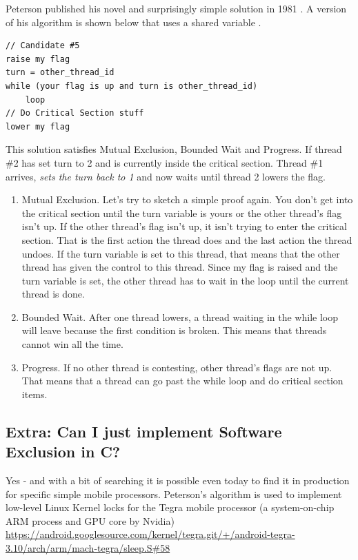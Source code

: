 Peterson published his novel and surprisingly simple solution in 1981 \cite{Peterson1981MythsAT}.
A version of his algorithm is shown below that uses a shared variable .

\begin{lstlisting}
// Candidate #5
raise my flag
turn = other_thread_id
while (your flag is up and turn is other_thread_id)
    loop
// Do Critical Section stuff
lower my flag
\end{lstlisting}

This solution satisfies Mutual Exclusion, Bounded Wait and Progress.
If thread \#2 has set turn to 2 and is currently inside the critical section.
Thread \#1 arrives, \emph{sets the turn back to 1} and now waits until thread 2 lowers the flag.

\begin{enumerate}
\item Mutual Exclusion. Let's try to sketch a simple proof again.
  You don't get into the critical section until the turn variable is yours or the other thread's flag isn't up.
  If the other thread's flag isn't up, it isn't trying to enter the critical section.
  That is the first action the thread does and the last action the thread undoes.
  If the turn variable is set to this thread, that means that the other thread has given the control to this thread.
  Since my flag is raised and the turn variable is set, the other thread has to wait in the loop until the current thread is done.
\item Bounded Wait. After one thread lowers, a thread waiting in the while loop will leave because the first condition is broken. This means that threads cannot win all the time.
\item Progress. If no other thread is contesting, other thread's flags are not up. That means that a thread can go past the while loop and do critical section items.
\end{enumerate}

\subsection{Extra: Can I just implement Software Exclusion in C?}

Yes - and with a bit of searching it is possible even today to find it in production for specific simple mobile processors.
Peterson's algorithm is used to implement low-level Linux Kernel locks for the Tegra mobile processor (a system-on-chip ARM process and GPU core by Nvidia) \href{Link to Lock Source}{https://android.googlesource.com/kernel/tegra.git/+/android-tegra-3.10/arch/arm/mach-tegra/sleep.S\#58}


